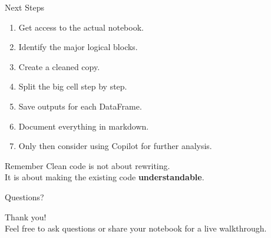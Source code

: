 \documentclass[aspectratio=169,11pt]{beamer}
\begin{document}
	\begin{frame}{Next Steps}
		\begin{enumerate}
			\item Get access to the actual notebook.
			\item Identify the major logical blocks.
			\item Create a cleaned copy.
			\item Split the big cell step by step.
			\item Save outputs for each DataFrame.
			\item Document everything in markdown.
			\item Only then consider using Copilot for further analysis.
		\end{enumerate}
		
		\begin{block}{Remember}
			Clean code is not about rewriting.\\
			It is about making the existing code \textbf{understandable}.
		\end{block}
	\end{frame}
	
	\begin{frame}{Questions?}
		\begin{center}
			\Large
			Thank you!\\[1em]
			\normalsize
			Feel free to ask questions or share your notebook for a live walkthrough.
		\end{center}
	\end{frame}
	
\end{document}
